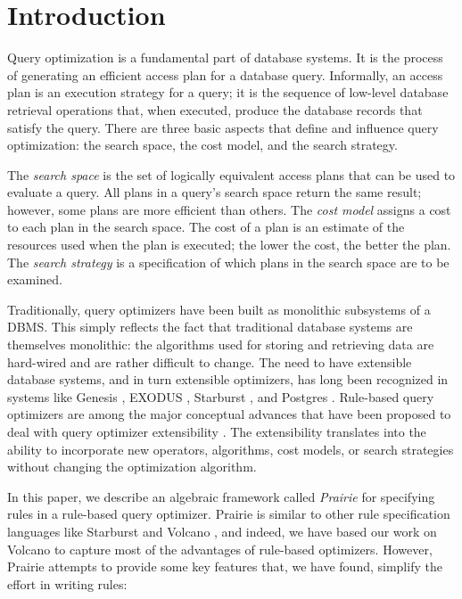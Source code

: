 \section{Introduction}
\label{sec:intro}

Query optimization \cite{Grae93} is a fundamental part of database
systems.  It is the process of generating an efficient access plan for
a database query.  Informally, an access plan is an execution strategy
for a query; it is the sequence of low-level database retrieval
operations that, when executed, produce the database records that
satisfy the query.  There are three basic aspects that define and
influence query optimization: the search space, the cost model, and the
search strategy.

The {\em search space} is the set of logically equivalent access plans
that can be used to evaluate a query.  All plans in a query's search
space return the same result; however, some plans are more efficient
than others.  The {\em cost model} assigns a cost to each plan in the
search space.  The cost of a plan is an estimate of the resources used
when the plan is executed; the lower the cost, the better the plan.
The {\em search strategy} is a specification of which plans in the
search space are to be examined.

Traditionally, query optimizers have been built as monolithic
subsystems of a DBMS.  This simply reflects the fact that traditional
database systems are themselves monolithic: the algorithms used for
storing and retrieving data are hard-wired and are rather difficult to
change.  The need to have extensible database systems, and in turn
extensible optimizers, has long been recognized in systems like Genesis
\cite{Bato88a}, EXODUS \cite{Grae87b}, Starburst \cite{Haas88}, and
Postgres \cite{Ston86b}.  Rule-based query optimizers are among the
major conceptual advances that have been proposed to deal with query
optimizer extensibility \cite{Haas88,Frey87a,Grae87b,Grae90b}.  The
extensibility translates into the ability to incorporate new operators,
algorithms, cost models, or search strategies without changing the
optimization algorithm.

In this paper, we describe an algebraic framework called \emph{Prairie}
for specifying rules in a rule-based query optimizer.  Prairie is
similar to other rule specification languages like Starburst
\cite{Haas88} and Volcano \cite{Grae90b}, and indeed, we have based our
work on Volcano to capture most of the advantages of rule-based
optimizers.  However, Prairie attempts to provide some key features
that, we have found, simplify the effort in writing rules:


